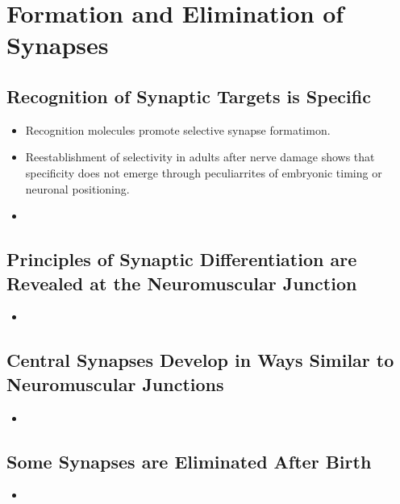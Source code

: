 \documentclass[12pt,a4paper]{article}
\begin{document}

\clearpage
\section{Formation and Elimination of Synapses}
\subsection{Recognition of Synaptic Targets is Specific}
\begin{itemize}
    \item Recognition molecules promote selective synapse formatimon.
    \item Reestablishment of selectivity in adults after nerve damage shows that specificity does not emerge through peculiarrites of embryonic timing or neuronal positioning.
    \item 
\end{itemize}

\subsection{Principles of Synaptic Differentiation are Revealed at the Neuromuscular Junction}
\begin{itemize}
    \item 
\end{itemize}

\subsection{Central Synapses Develop in Ways Similar to Neuromuscular Junctions}
\begin{itemize}
    \item 
\end{itemize}

\subsection{Some Synapses are Eliminated After Birth}
\begin{itemize}
    \item 
\end{itemize}

\end{document}
